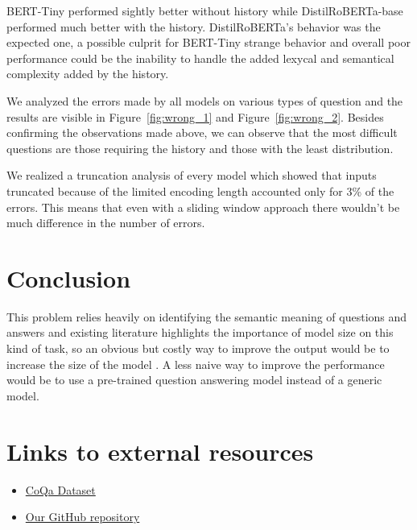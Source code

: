 \documentclass[11pt]{article}
\begin{document}
BERT-Tiny performed sightly better without history while DistilRoBERTa-base performed much better with the history. DistilRoBERTa's behavior was the expected one, a possible culprit for BERT-Tiny strange behavior and overall poor performance could be the inability to handle the added lexycal and semantical complexity added by the history.

We analyzed the errors made by all models on various types of question and the results are visible in Figure~\ref{fig:wrong_1} and Figure~\ref{fig:wrong_2}. Besides confirming the observations made above, we can observe that the most difficult questions are those requiring the history and those with the least distribution.

We realized a truncation analysis of every model which showed that inputs truncated because of the limited encoding length accounted only for 3\% of the errors. This means that even with a sliding window approach there wouldn't be much difference in the number of errors.

\section{Conclusion}
\label{sec:conclusion}


This problem relies heavily on identifying the semantic meaning of questions and answers and existing literature highlights the importance of model size on this kind of task, so an obvious but costly way to improve the output would be to increase the size of the model \cite{wei2022emergent}. A less naive way to improve the performance would be to use a pre-trained question answering model instead of a generic model.

\section{Links to external resources}
\label{sec:links}
\begin{itemize}[noitemsep,nolistsep]
    \item \href{https://stanfordnlp.github.io/coqa/}{CoQa Dataset} \cite{https://doi.org/10.48550/arxiv.1808.07042}
    \item \href{https://github.com/Danysan1/ai-unibo-nlp-project}{Our GitHub repository}
\end{itemize}
\end{document}
